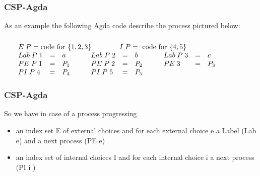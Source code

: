 \documentclass{beamer}
\newcommand{\includeXfigPictexWithoutFigure}[1]{\ifpdf
\begin{center}

\end{center}\else%
\begin{center}

\end{center}\fi}
\begin{document}
\begin{frame}
\frametitle{CSP-Agda}


\includeXfigPictexWithoutFigure{exampleProcess}



As an example the following Agda code describe the process pictured below:
\[\begin{array}[t]{@{}l} 
\\
E \; P = \mbox{code for }\{1,2,3\}\mbox{\qquad \quad \quad} I\; P = \mbox{ code for } \{4,5\}\\
\begin{array}[t]{@{}lclclclclcllclclclclclclclcl}
Lab \; P \;1 &=& a&\mbox{\quad} &Lab \;P\;2 &=& b &\mbox{\quad} &Lab\; P\;3 &=& c\\
PE \; P\;1 &=& P_1&\mbox{\quad} &PE \; P\;2 &=& P_2 &\mbox{\quad} &PE\;3 &=& P_3&
\mbox{\quad}& \\
PI\;P\;4 &=& P_4&\mbox{\quad} &PI\;P\;5 &=& P_5
\end{array} \end{array} \]

\end{frame}




\begin{frame}
\frametitle{CSP-Agda}
So we have in case of a process
progressing 
\begin{itemize}

\item an index set E of external choices and for each external choice e a Label (Lab e) and a next process (PE e)

\item an index set of internal
choices I and for each internal choice i a next process (PI i )



\end{itemize}
\end{frame}
\end{document}
